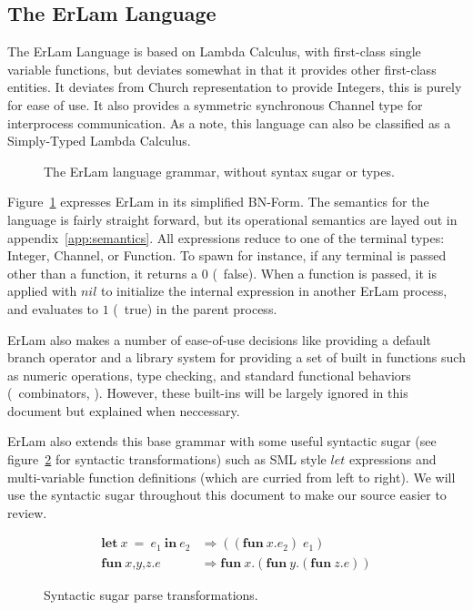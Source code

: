 \subsection{The ErLam Language}\label{sec:the erlam language}

The ErLam Language is based on Lambda Calculus, with first-class single 
variable functions, but deviates somewhat in that it provides other first-class 
entities. It deviates from Church representation to provide Integers, this is
purely for ease of use. It also provides a symmetric synchronous Channel type 
for interprocess communication. As a note, this language can also be classified 
as a Simply-Typed Lambda Calculus.

\begin{figure} %
\centering
{\footnotesize
    
}
\caption{The ErLam language grammar, without syntax sugar or types.}
\label{fig:grammer}
\end{figure}

Figure~\ref{fig:grammer} expresses ErLam in its simplified BN-Form. The 
semantics for the language is fairly straight forward, but its operational 
semantics are layed out in appendix~\ref{app:semantics}. All expressions reduce
to one of the terminal types: Integer, Channel, or Function. To spawn for 
instance, if any terminal is passed other than a function, it returns a $0$
(\eg~false). When a function is passed, it is applied with $nil$ to 
initialize the internal expression in another ErLam process, and evaluates to $1$ (\eg~true) in the parent process.

ErLam also makes a number of ease-of-use decisions like providing a default 
branch operator and a library system for providing a set of built in functions 
such as numeric operations, type checking, and standard functional behaviors 
(\eg~combinators, \etc). However, these built-ins will be largely ignored in 
this document but explained when neccessary. 

ErLam also extends this base grammar with some useful syntactic sugar (see 
figure~\ref{fig:sugar-transform} for syntactic transformations) such as SML 
style $let$ expressions and multi-variable function definitions (which are 
curried from left to right). We will use the syntactic sugar throughout this 
document to make our source easier to review.

\begin{figure}
    \centering
    \begin{align*}
        \textbf{let}\: x\: =\: e_1\: \textbf{in}\: e_2
        & \Rightarrow
        ((\textbf{fun}\: x.e_2)\; e_1) \\
% 
        \textbf{fun}\: \textit{x,y,z} . \textit{e}
        & \Rightarrow
        \textbf{fun}\: \textit{x} . (\textbf{fun}\: \textit{y} . (\textbf{fun}\: \textit{z} . \textit{e} ))
    \end{align*}
    \caption{Syntactic sugar parse transformations.}
    \label{fig:sugar-transform}
\end{figure}

